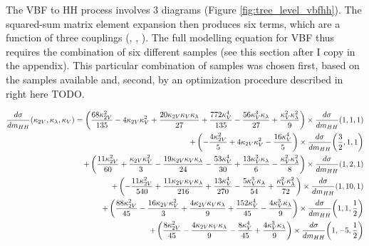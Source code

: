    The VBF to HH process involves 3 diagrams (Figure \ref{fig:tree_level_vbfhh}). 
    The squared-sum matrix element expansion then produces six terms, which are a function of three couplings (\kvv, \kl, \kv).
    The full modelling equation for VBF thus requires the combination of six different samples (see this section after I copy in the appendix).
    This particular combination of samples was chosen first, based on the samples available and, second, by an optimization procedure described in right here TODO.

    \begin{equation}
    \label{eqn:vbf_hh_6term_chosen}
    \begin{split}
        \frac{d\sigma}{dm_{HH}}(\kappa_{2V}, \kappa_{\lambda}, \kappa_{V}) =
            \left(\frac{68 \kappa_{2V}^{2}}{135} - 4 \kappa_{2V} \kappa_{V}^{2} + \frac{20 \kappa_{2V} \kappa_{V} \kappa_{\lambda}}{27} + \frac{772 \kappa_{V}^{4}}{135} - \frac{56 \kappa_{V}^{3} \kappa_{\lambda}}{27} + \frac{\kappa_{V}^{2} \kappa_{\lambda}^{2}}{9}\right) \times \frac{d\sigma}{dm_{HH}}{\left(1,1,1 \right)} \\
            + \left(- \frac{4 \kappa_{2V}^{2}}{5} + 4 \kappa_{2V} \kappa_{V}^{2} - \frac{16 \kappa_{V}^{4}}{5}\right) \times \frac{d\sigma}{dm_{HH}}{\left(\frac{3}{2},1,1 \right)} \\
            + \left(\frac{11 \kappa_{2V}^{2}}{60} + \frac{\kappa_{2V} \kappa_{V}^{2}}{3} - \frac{19 \kappa_{2V} \kappa_{V} \kappa_{\lambda}}{24} - \frac{53 \kappa_{V}^{4}}{30} + \frac{13 \kappa_{V}^{3} \kappa_{\lambda}}{6} - \frac{\kappa_{V}^{2} \kappa_{\lambda}^{2}}{8}\right) \times \frac{d\sigma}{dm_{HH}}{\left(1,2,1 \right)} \\
            + \left(- \frac{11 \kappa_{2V}^{2}}{540} + \frac{11 \kappa_{2V} \kappa_{V} \kappa_{\lambda}}{216} + \frac{13 \kappa_{V}^{4}}{270} - \frac{5 \kappa_{V}^{3} \kappa_{\lambda}}{54} + \frac{\kappa_{V}^{2} \kappa_{\lambda}^{2}}{72}\right) \times \frac{d\sigma}{dm_{HH}}{\left(1,10,1 \right)}  \\
            + \left(\frac{88 \kappa_{2V}^{2}}{45} - \frac{16 \kappa_{2V} \kappa_{V}^{2}}{3} + \frac{4 \kappa_{2V} \kappa_{V} \kappa_{\lambda}}{9} + \frac{152 \kappa_{V}^{4}}{45} - \frac{4 \kappa_{V}^{3} \kappa_{\lambda}}{9}\right) \times \frac{d\sigma}{dm_{HH}}{\left(1,1,\frac{1}{2} \right)} \\
            + \left(\frac{8 \kappa_{2V}^{2}}{45} - \frac{4 \kappa_{2V} \kappa_{V} \kappa_{\lambda}}{9} - \frac{8 \kappa_{V}^{4}}{45} + \frac{4 \kappa_{V}^{3} \kappa_{\lambda}}{9}\right) \times \frac{d\sigma}{dm_{HH}}{\left(1,-5,\frac{1}{2} \right)}
    \end{split}
    \end{equation}

